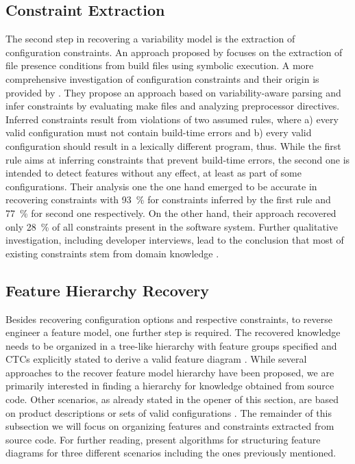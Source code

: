 \subsection{Constraint Extraction}
The second step in recovering a variability model is the
extraction of configuration constraints. An approach proposed by \cite{zhou_extracting_2015}
focuses on the extraction of file presence conditions from build files using symbolic execution. A more comprehensive investigation of configuration
constraints and their origin is provided by \cite{nadi_mining_2014,nadi_where_2015}. They
propose an approach based on variability-aware parsing and infer constraints by
evaluating make files and  analyzing preprocessor directives. Inferred
constraints result from violations of two assumed rules, where a) every valid
configuration must not contain build-time errors and b) every valid
configuration should result in a lexically different program, thus. While the
first rule aims at inferring constraints that prevent build-time errors, the
second one is intended to detect features without any effect, at least as part
of some configurations. Their analysis one the one hand emerged to be accurate
in recovering constraints with 93~\% for constraints inferred by the first rule
and 77~\% for second one respectively. On the other hand, their approach
recovered only 28~\% of all constraints present in the software system.
Further qualitative investigation, including developer interviews, lead to
the conclusion that most of existing constraints stem from domain knowledge
\citep{nadi_where_2015}.

\subsection{Feature Hierarchy Recovery} 
Besides recovering configuration options and respective constraints, to reverse
engineer a feature model, one further step is required. The recovered knowledge
needs to be organized in a tree-like hierarchy with feature groups specified and
CTCs explicitly stated to derive a valid feature diagram 
\citep{kang_feature-oriented_1990}.
While several approaches to the recover feature model hierarchy have been proposed, we are primarily interested in finding a hierarchy for knowledge obtained from
source code. Other scenarios, as already stated in the opener of this section,
are based on product descriptions or sets of valid configurations
\citep{aleti_software_2013,bakar_feature_2015}. The remainder of this subsection
we will focus on organizing features and constraints extracted from source code. For further reading, \cite{andersen_efficient_2012} present
algorithms for structuring feature diagrams for three different scenarios including the
ones previously mentioned.

